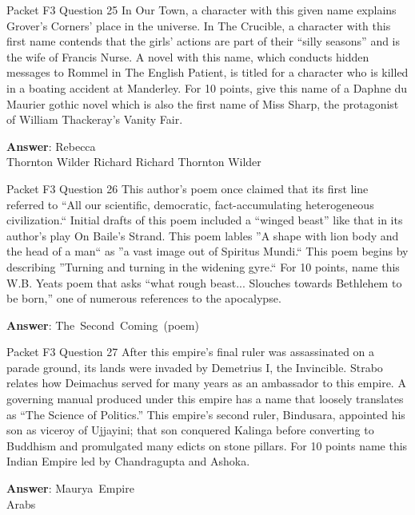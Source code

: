 \begin{frame}{Packet F3 Question 25}
In Our Town, a character   with this given name explains Grover’s Corners’ place in the universe. In The Crucible, a character   with this first name contends that the girls’ actions are part of their “silly seasons” and is the wife of Francis Nurse. A novel with this name, which conducts hidden messages to Rommel in The English Patient, is titled for a character who is killed in a boating accident at Manderley. For 10 points, give this name of a Daphne du Maurier     gothic novel which is also the first name of Miss Sharp, the protagonist of William Thackeray's Vanity Fair.    

\textbf{Answer}: Rebecca\\
 Thornton Wilder
 Richard
 Richard
 Thornton Wilder
\end{frame}

\begin{frame}{Packet F3 Question 26}
This author's poem once claimed that its first line referred to “All our scientific, democratic, fact-accumulating heterogeneous civilization.`` Initial drafts of this poem included a “winged beast” like that in its author's play On Baile's Strand. This poem lables ''A shape with lion body and the head   of a man`` as ''a vast image out of Spiritus   Mundi.`` This poem begins by describing   ''Turning and turning in the widening gyre.`` For 10 points,   name this W.B. Yeats poem that asks “what rough beast... Slouches towards Bethlehem to be born,'' one of numerous references to the apocalypse.

\textbf{Answer}: The\ Second\ Coming\ (poem)\\
\end{frame}

\begin{frame}{Packet F3 Question 27}
After this empire's final   ruler was assassinated on a parade ground, its lands were invaded by Demetrius I, the Invincible.   Strabo relates how Deimachus served for many years as an ambassador to this empire. A governing manual produced under this empire has a name that loosely translates as ``The Science of Politics.'' This empire's second ruler, Bindusara, appointed his son as viceroy of Ujjayini; that son conquered Kalinga before converting to Buddhism and promulgated     many edicts on stone pillars.   For 10 points name this Indian Empire led by Chandragupta and Ashoka.

\textbf{Answer}: Maurya\ Empire\\
 Arabs
\end{frame}

